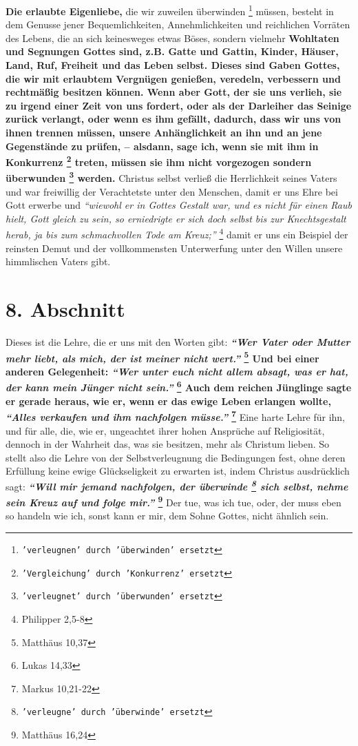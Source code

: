 \textbf{Die erlaubte Eigenliebe,} die wir zuweilen überwinden
\footnote{\texttt{'verleugnen' durch 'überwinden' ersetzt}} müssen, besteht in dem
Genusse jener Bequemlichkeiten, Annehmlichkeiten und reichlichen Vorräten des
Lebens, die an sich keinesweges etwas Böses, sondern vielmehr \textbf{Wohltaten
und
Segnungen Gottes sind, z.B. Gatte und Gattin, Kinder, Häuser, Land, Ruf,
Freiheit und das Leben selbst. Dieses sind Gaben Gottes, die wir mit erlaubtem
Vergnügen genießen, veredeln, verbessern und rechtmäßig besitzen können. Wenn
aber Gott, der sie uns verlieh, sie zu irgend einer Zeit von uns fordert, oder
als der Darleiher das Seinige zurück verlangt, oder wenn es ihm gefällt,
dadurch, dass wir uns von ihnen trennen müssen, unsere Anhänglichkeit an ihn und
an jene Gegenstände zu prüfen, -- alsdann, sage ich, wenn sie mit ihm in
Konkurrenz \footnote{\texttt{'Vergleichung' durch 'Konkurrenz' ersetzt}} treten, müssen
sie ihm nicht vorgezogen sondern überwunden \footnote{\texttt{'verleugnet' durch
'überwunden' ersetzt}} werden.}
Christus selbst verließ die Herrlichkeit seines Vaters und war freiwillig der
Verachtetste unter den Menschen, damit er uns Ehre bei Gott erwerbe und
\textit{"`wiewohl er in Gottes Gestalt war, und es nicht für einen Raub hielt,
Gott
gleich zu sein, so erniedrigte er sich doch selbst bis zur Knechtsgestalt
herab, ja bis zum schmachvollen Tode am Kreuz;"'}
\footnote{Philipper 2,5-8}
damit er
uns ein Beispiel der reinsten Demut und der vollkommensten Unterwerfung unter
den Willen unsere himmlischen Vaters gibt.

\section{8. Abschnitt} \label{kap4_ab8}

Dieses ist die Lehre, die er uns mit den Worten gibt:
\textbf{
\textit{"`Wer Vater oder Mutter mehr liebt, als mich, der ist meiner nicht
wert."'}
\footnote{Matthäus  10,37}
Und bei einer anderen Gelegenheit:
\textit{"`Wer unter euch nicht allem absagt, was er hat, der kann mein Jünger
nicht sein."'}
\footnote{Lukas 14,33} Auch dem reichen
Jünglinge sagte er gerade heraus, wie er, wenn er das ewige Leben erlangen
wollte,
\textit{"`Alles verkaufen und ihm nachfolgen müsse."'}
\footnote{Markus 10,21-22}
}
Eine harte Lehre für ihn, und für alle, die, wie er, ungeachtet ihrer hohen
Ansprüche auf Religiosität, dennoch in der Wahrheit das, was sie besitzen, mehr
als Christum lieben. So stellt also die Lehre von der Selbstverleugnung die
Bedingungen fest, ohne deren Erfüllung keine ewige Glückseligkeit zu erwarten
ist, indem Christus ausdrücklich sagt:
\textbf{
\textit{"`Will mir jemand nachfolgen, der überwinde \footnote{\texttt{'verleugne'
durch 'überwinde' ersetzt}} sich selbst, nehme sein Kreuz auf und folge
mir."'}
\footnote{Matthäus 16,24}}
Der tue, was ich tue, oder, der muss eben so handeln wie ich, sonst kann
er mir, dem Sohne Gottes, nicht ähnlich sein.

